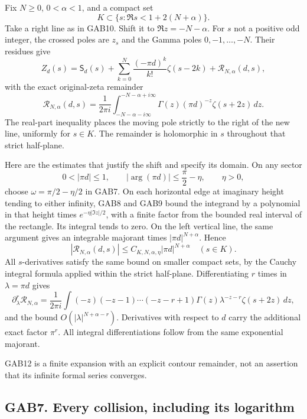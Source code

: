 \documentclass[
  10pt,
  a4paper,
]{article}
\begin{document}
Fix \(N\ge0\), \(0<\alpha<1\), and a compact set \[
 K\subset\{s:\Re s<1+2(N+\alpha)\}.
\] Take a right line as in GAB10. Shift it to \(\Re z=-N-\alpha\). For
\(s\) not a positive odd integer, the crossed poles are \(z_s\) and the
Gamma poles \(0,-1,\ldots,-N\). Their residues give \[
 \boxed{\displaystyle
 Z_d(s)=\mathsf S_d(s)
       +\sum_{k=0}^{N}\frac{(-\pi d)^k}{k!}\zeta(s-2k)
       +\mathcal R_{N,\alpha}(d,s),}
                                                        \tag{GAB12}
\] with the exact original-zeta remainder \[
 \mathcal R_{N,\alpha}(d,s)
   =\frac1{2\pi i}\int_{-N-\alpha-i\infty}^{-N-\alpha+i\infty}
       \Gamma(z)(\pi d)^{-z}\zeta(s+2z)\,dz.             \tag{GAB13}
\] The real-part inequality places the moving pole strictly to the right
of the new line, uniformly for \(s\in K\). The remainder is holomorphic
in \(s\) throughout that strict half-plane.

Here are the estimates that justify the shift and specify its domain. On
any sector \[
 0<|\pi d|\le1,\qquad |\arg(\pi d)|\le\frac{\pi}{2}-\eta,
 \qquad \eta>0,
\] choose \(\omega=\pi/2-\eta/2\) in GAB7. On each horizontal edge at
imaginary height tending to either infinity, GAB8 and GAB9 bound the
integrand by a polynomial in that height times \(e^{-\eta |\Im z|/2}\),
with a finite factor from the bounded real interval of the rectangle.
Its integral tends to zero. On the left vertical line, the same argument
gives an integrable majorant times \(|\pi d|^{N+\alpha}\). Hence \[
 |\mathcal R_{N,\alpha}(d,s)|
       \le C_{K,N,\alpha,\eta}|\pi d|^{N+\alpha}
       \quad(s\in K).                                  \tag{GAB14}
\] All \(s\)-derivatives satisfy the same bound on smaller compact sets,
by the Cauchy integral formula applied within the strict half-plane.
Differentiating \(r\) times in \(\lambda=\pi d\) gives \[
 \partial_\lambda^r\mathcal R_{N,\alpha}
 =\frac1{2\pi i}\int
    (-z)(-z-1)\cdots(-z-r+1)
    \Gamma(z)\lambda^{-z-r}\zeta(s+2z)\,dz,
\] and the bound \(O(|\lambda|^{N+\alpha-r})\). Derivatives with respect
to \(d\) carry the additional exact factor \(\pi^r\). All integral
differentiations follow from the same exponential majorant.

GAB12 is a finite expansion with an explicit contour remainder, not an
assertion that its infinite formal series converges.

\subsection{GAB7. Every collision, including its
logarithm}\label{gab7.-every-collision-including-its-logarithm}
\end{document}
